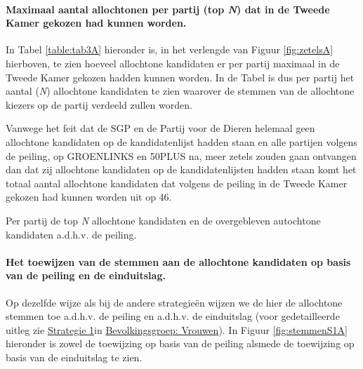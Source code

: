 \paragraph{Maximaal aantal allochtonen per partij (top \textit{N}) dat in de Tweede Kamer gekozen had kunnen worden.}
In Tabel \ref{table:tab3A} hieronder is, in het verlengde van Figuur \ref{fig:zetelsA} hierboven, te zien hoeveel allochtone kandidaten er per partij maximaal in de Tweede Kamer gekozen hadden kunnen worden. In de Tabel is dus per partij het aantal (\textit{N}) allochtone kandidaten te zien waarover de stemmen van de allochtone kiezers op de partij verdeeld zullen worden.  

Vanwege het feit dat de SGP en de Partij voor de Dieren helemaal geen allochtone kandidaten op de kandidatenlijst hadden staan en alle partijen volgens de peiling, op GROENLINKS en 50PLUS na, meer zetels zouden gaan ontvangen dan dat zij allochtone kandidaten op de kandidatenlijsten hadden staan komt het totaal aantal allochtone kandidaten dat volgens de peiling in de Tweede Kamer gekozen had kunnen worden uit op 46. 





\begin{table}[H]
\centering
	\begin{footnotesize}
		
	\end{footnotesize}
			\caption{Per partij de top \textit{N} allochtone kandidaten en de overgebleven autochtone kandidaten a.d.h.v. de peiling.}
\label{table:tab3A} 
\end{table}



\paragraph{Het toewijzen van de stemmen aan de allochtone kandidaten op basis van de peiling en de einduitslag.}
Op dezelfde wijze als bij de andere strategie\"{e}n wijzen we de hier de allochtone stemmen toe a.d.h.v. de peiling en a.d.h.v. de einduitslag (voor gedetailleerde uitleg zie \hyperref[S1V]{Strategie 1}in \hyperref[vrouwen]{Bevolkingsgroep: Vrouwen}). In Figuur \ref{fig:stemmenS1A} hieronder is zowel de toewijzing op basis van de peiling alsmede de toewijzing op basis van de einduitslag te zien.





